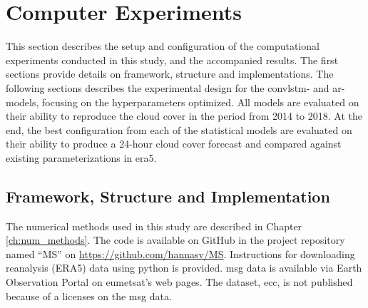 \section{Computer Experiments} \label{ch:computer_experiments}
This section describes the setup and configuration of the computational experiments conducted in this study, and the accompanied results. The first sections provide details on framework, structure and implementations. The following sections describes the experimental design for the \acrshort{convlstm}- and \acrshort{ar}-models, focusing on the hyperparameters optimized. All models are evaluated on their ability to reproduce the cloud cover in the period from 2014 to 2018. At the end, the best configuration from each of the statistical models are evaluated on their ability to produce a 24-hour cloud cover forecast and compared against existing parameterizations in \acrshort{era5}.

\subsection{Framework, Structure and Implementation} \label{sec:structure_and_implementations} \label{sec:framework}
The numerical methods used in this study are described in Chapter \ref{ch:num_methods}. The code is available on GitHub in the project repository named ``MS'' on \href{https://github.com/hannasv/MS}{https://github.com/hannasv/MS}. Instructions for downloading 
reanalysis (ERA5) data using python is provided. \acrshort{msg} data is available via Earth Observation Portal on \acrshort{eumetsat}'s web pages. The dataset, \acrshort{ecc}, is not published because of a licenses on the \acrshort{msg} data. %

